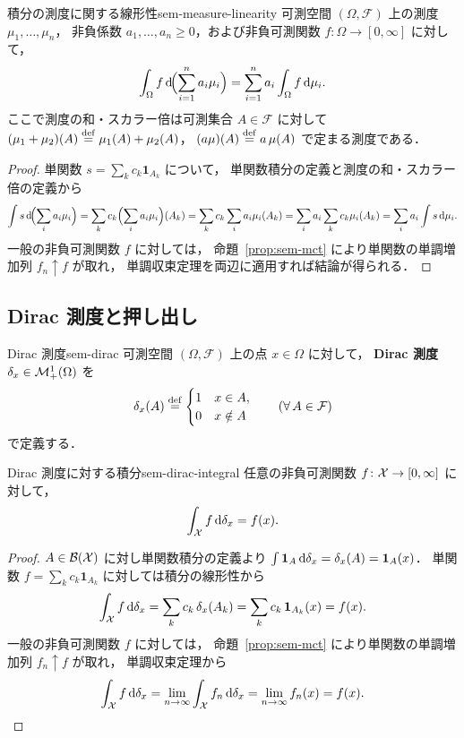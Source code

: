 \begin{proposition}{積分の測度に関する線形性}{sem-measure-linearity}
  可測空間 $(\Omega, \mathcal{F})$ 上の測度 $\mu_1, \ldots, \mu_n$，
  非負係数 $a_1, \ldots, a_n \geq 0$，および非負可測関数
  $f \colon \Omega \to [0, \infty]$ に対して，
  \[
    \int_\Omega f \, \mathrm{d}\!\Bigl(\sum_{i=1}^{n} a_i \mu_i\Bigr)
    = \sum_{i=1}^{n} a_i \int_\Omega f \, \mathrm{d}\mu_i.
  \]
  ここで測度の和・スカラー倍は可測集合 $A \in \mathcal{F}$ に対して
  $(\mu_1 + \mu_2)(A) \overset{\mathrm{def}}{=} \mu_1(A) + \mu_2(A)$，
  $(a\mu)(A) \overset{\mathrm{def}}{=} a\, \mu(A)$ で定まる測度である．
\end{proposition}

\begin{proof}
  単関数 $s = \sum_{k} c_k \mathbf{1}_{A_k}$ について，
  単関数積分の定義と測度の和・スカラー倍の定義から
  \[
    \int s \, \mathrm{d}\!\Bigl(\sum_i a_i \mu_i\Bigr)
    = \sum_k c_k \Bigl(\sum_i a_i \mu_i\Bigr)(A_k)
    = \sum_k c_k \sum_i a_i \mu_i(A_k)
    = \sum_i a_i \sum_k c_k \mu_i(A_k)
    = \sum_i a_i \int s \, \mathrm{d}\mu_i.
  \]
  一般の非負可測関数 $f$ に対しては，
  命題~\ref{prop:sem-mct} により単関数の単調増加列 $f_n \uparrow f$ が取れ，
  単調収束定理を両辺に適用すれば結論が得られる．
\end{proof}

\subsection{Dirac 測度と押し出し}
\label{sec:sem-dirac-pushforward}

\begin{definition}{Dirac 測度}{sem-dirac}
  可測空間 $(\Omega, \mathcal{F})$ 上の点 $x \in \Omega$ に対して，
  \textbf{Dirac 測度} $\delta_x \in \mathcal{M}_+^1(\Omega)$ を
  \[
    \delta_x(A) \overset{\mathrm{def}}{=}
    \begin{cases}
      1 & x \in A, \\
      0 & x \notin A
    \end{cases}
    \qquad (\forall\, A \in \mathcal{F})
  \]
  で定義する．
\end{definition}

\begin{claim}{Dirac 測度に対する積分}{sem-dirac-integral}
  任意の非負可測関数 $f \colon \mathcal{X} \to [0, \infty]$ に対して，
  \[
    \int_{\mathcal{X}} f \, \mathrm{d}\delta_x = f(x).
  \]
\end{claim}

\begin{proof}
  $A \in \mathcal{B}(\mathcal{X})$ に対し単関数積分の定義より
  $\int \mathbf{1}_A \, \mathrm{d}\delta_x = \delta_x(A) = \mathbf{1}_A(x)$．
  単関数 $f = \sum_k c_k \mathbf{1}_{A_k}$ に対しては積分の線形性から
  \[
    \int_{\mathcal{X}} f \, \mathrm{d}\delta_x
    = \sum_k c_k \, \delta_x(A_k)
    = \sum_k c_k \, \mathbf{1}_{A_k}(x)
    = f(x).
  \]
  一般の非負可測関数 $f$ に対しては，
  命題~\ref{prop:sem-mct} により単関数の単調増加列 $f_n \uparrow f$ が取れ，
  単調収束定理から
  \[
    \int_{\mathcal{X}} f \, \mathrm{d}\delta_x
    = \lim_{n \to \infty} \int_{\mathcal{X}} f_n \, \mathrm{d}\delta_x
    = \lim_{n \to \infty} f_n(x)
    = f(x).
  \]
\end{proof}

